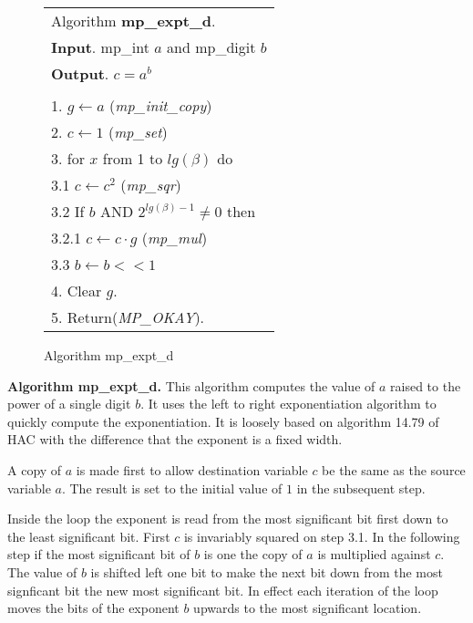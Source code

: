 \documentclass[b5paper]{book}
\begin{document}
\newpage\begin{figure}[!here]
\begin{small}
\begin{center}
\begin{tabular}{l}
\hline Algorithm \textbf{mp\_expt\_d}. \\
\textbf{Input}.   mp\_int $a$ and mp\_digit $b$ \\
\textbf{Output}.  $c = a^b$ \\
\hline \\
1.  $g \leftarrow a$ (\textit{mp\_init\_copy}) \\
2.  $c \leftarrow 1$ (\textit{mp\_set}) \\
3.  for $x$ from 1 to $lg(\beta)$ do \\
\hspace{3mm}3.1  $c \leftarrow c^2$ (\textit{mp\_sqr}) \\
\hspace{3mm}3.2  If $b$ AND $2^{lg(\beta) - 1} \ne 0$ then \\
\hspace{6mm}3.2.1  $c \leftarrow c \cdot g$ (\textit{mp\_mul}) \\
\hspace{3mm}3.3  $b \leftarrow b << 1$ \\
4.  Clear $g$. \\
5.  Return(\textit{MP\_OKAY}). \\
\hline
\end{tabular}
\end{center}
\end{small}
\caption{Algorithm mp\_expt\_d}
\end{figure}

\textbf{Algorithm mp\_expt\_d.}
This algorithm computes the value of $a$ raised to the power of a single digit $b$.  It uses the left to right exponentiation algorithm to
quickly compute the exponentiation.  It is loosely based on algorithm 14.79 of HAC \cite[pp. 615]{HAC} with the difference that the 
exponent is a fixed width.  

A copy of $a$ is made first to allow destination variable $c$ be the same as the source variable $a$.  The result is set to the initial value of 
$1$ in the subsequent step.

Inside the loop the exponent is read from the most significant bit first down to the least significant bit.  First $c$ is invariably squared
on step 3.1.  In the following step if the most significant bit of $b$ is one the copy of $a$ is multiplied against $c$.  The value
of $b$ is shifted left one bit to make the next bit down from the most signficant bit the new most significant bit.  In effect each
iteration of the loop moves the bits of the exponent $b$ upwards to the most significant location.
\end{document}
